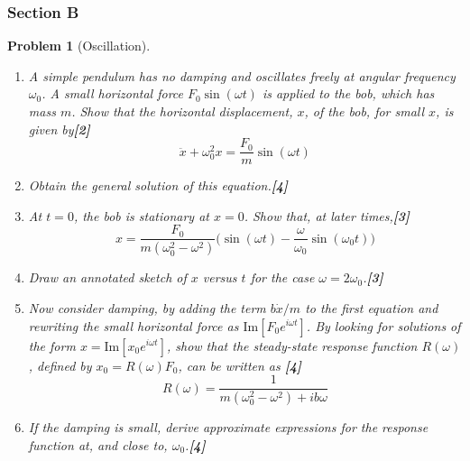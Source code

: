 \documentclass[a4paper]{article}
\theoremstyle{new}
\newtheorem{qns}{Problem}[subsection]
\begin{document}
\subsubsection{Section B}
\begin{qns}[Oscillation]\leavevmode
\begin{enumerate}[label=(\roman*)]
\item A simple pendulum has no damping and oscillates freely at angular frequency $\omega_0$. A small horizontal force $F_0\sin(\omega t)$ is applied to the bob, which has mass $m$. Show that the horizontal displacement, $x$, of the bob, for small $x$, is given by\hfill\textbf{[2]}
$$\ddot{x}+\omega_0^2x=\frac{F_0}{m}\sin(\omega t)$$
\item Obtain the general solution of this equation.\hfill\textbf{[4]}
\item At $t = 0$, the bob is stationary at $x = 0$. Show that, at later times,\hfill\textbf{[3]}
$$x=\frac{F_0}{m(\omega_0^2-\omega^2)}\bigg(\sin(\omega t)-\frac{\omega}{\omega_0}\sin(\omega_0t)\bigg)$$
\item Draw an annotated sketch of $x$ versus $t$ for the case $\omega=2\omega_0$.\hfill\textbf{[3]}\item Now consider damping, by adding the term $b\dot{x}/m$ to the first equation and rewriting the small horizontal force as $\text{Im}[F_0e^{i\omega t}]$. By looking for solutions of the form $x=\text{Im}[x_0e^{i\omega t}]$, show that the steady-state response function $R(\omega)$, defined by $x_0=R(\omega)F_0$, can be written as \hfill\textbf{[4]}
$$R(\omega)=\frac{1}{m(\omega_0^2-\omega^2)+ib\omega}$$
\item If the damping is small, derive approximate expressions for the response function at, and close to, $\omega_0$.\hfill\textbf{[4]}
\end{enumerate}
\end{qns}
\end{document}
